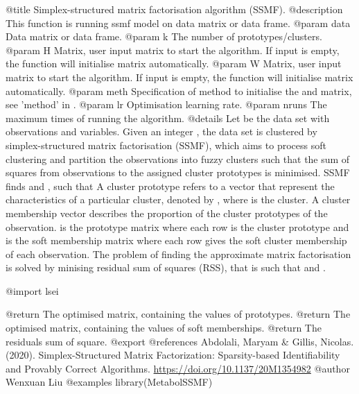 \documentclass[
]{article}
\begin{document}
{{@title Simplex-structured matrix factorisation algorithm (SSMF).
@description This function is running ssmf model on data matrix or data frame.
@param data Data matrix or data frame.
@param k The number of prototypes/clusters.
@param H Matrix, user input  matrix to start the algorithm. If input is empty, the function will initialise  matrix automatically.
@param W Matrix, user input  matrix to start the algorithm. If input is empty, the function will initialise  matrix automatically.
@param meth Specification of method to initialise the  and  matrix, see 'method' in .
@param lr Optimisation learning rate.
@param nruns The maximum times of running the algorithm.
@details
Let  be the data set  with  observations and  variables.
Given an integer ,
the data set is clustered by simplex-structured matrix factorisation (SSMF), which aims to process soft clustering
and partition the observations into  fuzzy clusters such that the sum of squares from observations to the
assigned cluster prototypes is minimised.
SSMF finds  and ,
such that 
A cluster prototype refers to a vector that represent the characteristics of a particular cluster,
denoted by  , where  is the  cluster.
A cluster membership vector  describes the proportion of the cluster prototypes
of the  observation.  is the prototype matrix where each row is the cluster prototype and
 is the soft membership matrix where each row gives the soft cluster membership of each observation.
The problem of finding the approximate matrix factorisation is solved by minising residual sum of squares (RSS), that is
such that   and  .

@import lsei

@return  The optimised  matrix, containing the values of prototypes.
@return  The optimised  matrix, containing the values of soft memberships.
@return  The residuals sum of square.
@export
@references Abdolali, Maryam & Gillis, Nicolas. (2020). Simplex-Structured Matrix Factorization: Sparsity-based Identifiability and Provably Correct Algorithms. \url{https://doi.org/10.1137/20M1354982}
@author Wenxuan Liu
@examples
library(MetabolSSMF)

}}
\end{document}
